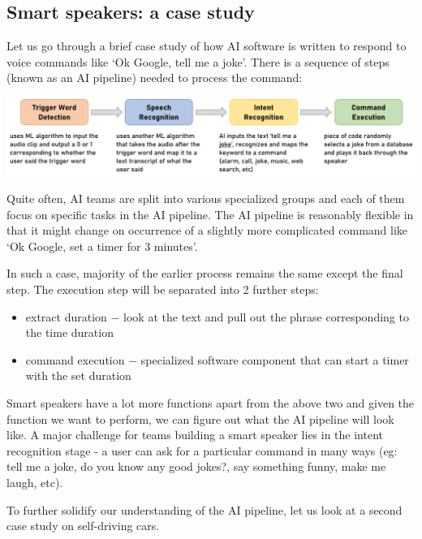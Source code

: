 \documentclass{article}[a4paper,12pt]
\theoremstyle{definition}
\begin{document}
\subsection{Smart speakers: a case study}
Let us go through a brief case study of how AI software is written to respond to voice commands like `Ok Google, tell me a joke'. There is a sequence of steps (known as an AI pipeline) needed to process the command:
\begin{center}
\includegraphics[width=\textwidth]{smart_speaker_steps1.png}
\end{center}
Quite often, AI teams are split into various specialized groups and each of them focus on specific tasks in the AI pipeline. The AI pipeline is reasonably flexible in that it might change on occurrence of a slightly more complicated command like `Ok Google, set a timer for 3 minutes'.
\vspace{6pt}

In such a case, majority of the earlier process remains the same except the final step. The execution step will be separated into 2 further steps:
\begin{itemize}
	\item extract duration $-$ look at the text and pull out the phrase corresponding to the time duration
	\item command execution $-$ specialized software component that can start a timer with the set duration
\end{itemize}
Smart speakers have a lot more functions apart from the above two and given the function we want to perform, we can figure out what the AI pipeline will look like. A major challenge for teams building a smart speaker lies in the intent recognition stage - a user can ask for a particular command in many ways (eg: tell me a joke, do you know any good jokes?, say something funny, make me laugh, etc).
\vspace{6pt}

To further solidify our understanding of the AI pipeline, let us look at a second case study on self-driving cars.
\end{document}
